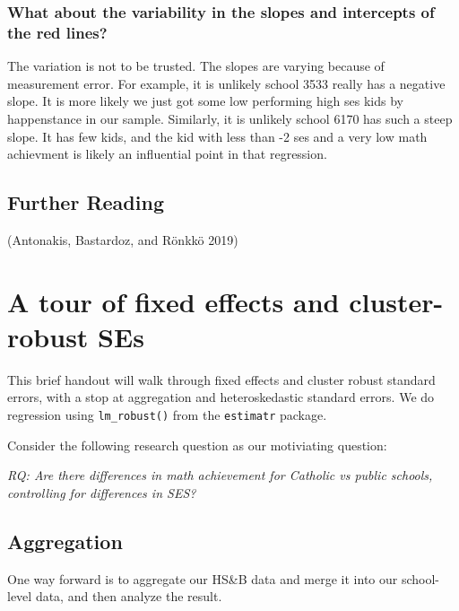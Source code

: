 \documentclass[
  letterpaper,
  DIV=11,
  numbers=noendperiod]{scrreprt}
\begin{document}
\hypertarget{what-about-the-variability-in-the-slopes-and-intercepts-of-the-red-lines}{%
\subsection{What about the variability in the slopes and intercepts of
the red
lines?}\label{what-about-the-variability-in-the-slopes-and-intercepts-of-the-red-lines}}

The variation is not to be trusted. The slopes are varying because of
measurement error. For example, it is unlikely school 3533 really has a
negative slope. It is more likely we just got some low performing high
ses kids by happenstance in our sample. Similarly, it is unlikely school
6170 has such a steep slope. It has few kids, and the kid with less than
-2 ses and a very low math achievment is likely an influential point in
that regression.

\hypertarget{further-reading-3}{%
\section{Further Reading}\label{further-reading-3}}

(Antonakis, Bastardoz, and Rönkkö 2019)

\hypertarget{a-tour-of-fixed-effects-and-cluster-robust-ses}{%
\chapter{A tour of fixed effects and cluster-robust
SEs}\label{a-tour-of-fixed-effects-and-cluster-robust-ses}}

This brief handout will walk through fixed effects and cluster robust
standard errors, with a stop at aggregation and heteroskedastic standard
errors. We do regression using \texttt{lm\_robust()} from the
\texttt{estimatr} package.

Consider the following research question as our motiviating question:

\emph{RQ: Are there differences in math achievement for Catholic vs
public schools, controlling for differences in SES?}

\hypertarget{aggregation}{%
\section{Aggregation}\label{aggregation}}

One way forward is to aggregate our HS\&B data and merge it into our
school-level data, and then analyze the result.
\end{document}
